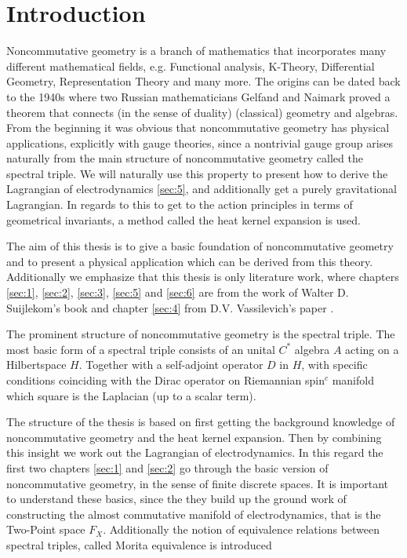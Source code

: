 \section{Introduction}
Noncommutative geometry is a branch of mathematics that incorporates many
different mathematical fields, e.g. Functional analysis, K-Theory,
Differential Geometry, Representation Theory and many more. The origins can
be dated back to the 1940s where two Russian mathematicians Gelfand and
Naimark proved a theorem that connects (in the sense of duality) (classical)
geometry and algebras. From the beginning it was obvious that noncommutative
geometry has physical applications, explicitly with gauge theories, since a
nontrivial gauge group arises naturally from the main structure of
noncommutative geometry called the spectral triple. We will naturally use
this property to present how to derive the Lagrangian of electrodynamics
\ref{sec:5}, and additionally get a purely gravitational Lagrangian.
In regards to this to get to the action principles in terms of geometrical
invariants, a method called the heat kernel expansion is used.

The aim of this thesis is to give a basic foundation of noncommutative
geometry and to present a physical application which can be derived from this
theory. Additionally we emphasize that this thesis is only literature work,
where chapters \ref{sec:1}, \ref{sec:2}, \ref{sec:3}, \ref{sec:5} and \ref{sec:6} are from
the work of Walter D. Suijlekom's book \cite{ncgwalter} and chapter
\ref{sec:4} from D.V. Vassilevich's paper \cite{heatkernel}.

The prominent structure of noncommutative geometry is the spectral triple.
The most basic form of a spectral triple consists of an unital $C^*$ algebra
$A$ acting on a Hilbertspace $H$. Together with a self-adjoint operator $D$ in
$H$, with specific conditions coinciding with the Dirac operator on
Riemannian spin$^c$ manifold which square is the Laplacian (up to a scalar
term).

The structure of the thesis is based on first getting the background
knowledge of noncommutative geometry and the heat kernel expansion. Then by
combining this insight we work out the Lagrangian of electrodynamics. In this
regard the first two chapters \ref{sec:1} and \ref{sec:2} go through the
basic version of noncommutative geometry, in the sense of finite discrete
spaces. It is important to understand these basics, since the they build up
the ground work of constructing the almost commutative manifold of
electrodynamics, that is the Two-Point space $F_X$. Additionally the notion
of equivalence relations between spectral triples, called Morita equivalence is
introduced

